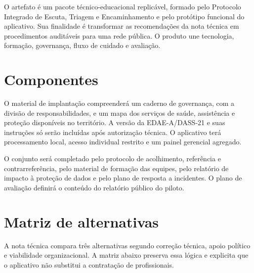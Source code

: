 \documentclass[
  12pt,
  openright,
  oneside,
  a4paper,
  english,
  brazil
]{abntex2}
\begin{document}
O artefato é um pacote técnico-educacional replicável, formado pelo Protocolo
Integrado de Escuta, Triagem e Encaminhamento e pelo protótipo funcional do
aplicativo. Sua finalidade é transformar as recomendações da nota técnica em
procedimentos auditáveis para uma rede pública. O produto une tecnologia,
formação, governança, fluxo de cuidado e avaliação.

\section{Componentes}

O material de implantação compreenderá um caderno de governança, com a divisão
de responsabilidades, e um mapa dos serviços de saúde, assistência e proteção
disponíveis no território. A versão da EDAE-A/DASS-21 e suas instruções só serão
incluídas após autorização técnica. O aplicativo terá processamento local,
acesso individual restrito e um painel gerencial agregado.

O conjunto será completado pelo protocolo de acolhimento, referência e
contrarreferência, pelo material de formação das equipes, pelo relatório de
impacto à proteção de dados e pelo plano de resposta a incidentes. O plano de
avaliação definirá o conteúdo do relatório público do piloto.

\section{Matriz de alternativas}

A nota técnica compara três alternativas segundo correção técnica, apoio
político e viabilidade organizacional. A matriz abaixo preserva essa lógica e
explicita que o aplicativo não substitui a contratação de profissionais.
\end{document}

